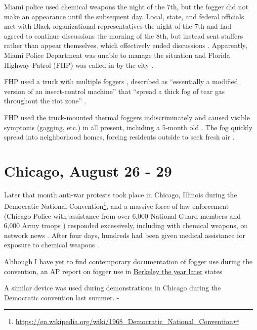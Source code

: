 \documentclass[
  11pt,
]{krantz}
\renewenvironment{quote}{\begin{VF}}{\end{VF}}
\renewcommand{\href}[2]{#2\footnote{\url{#1}}}
\begin{document}
Miami police used chemical weapons the night of the 7th, but the fogger did not make an appearance until the subsequent day.
Local, state, and federal officials met with Black organizational representatives the night of the 7th and had agreed to continue discussions the morning of the 8th, but instead sent staffers rather than appear themselves, which effectively ended discussions \citep{Tschenschlok1995, Tschenschlok1996}.
Apparently, Miami Police Department was unable to manage the situation and Florida Highway Patrol (FHP) was called in by the city \citep{Tschenschlok1995}.

FHP used a truck with multiple foggers \citep{Lorentzen2018}, described as ``essentially a modified version of an insect-control machine'' that ``spread a thick fog of tear gas throughout the riot zone'' \citep{Tschenschlok1995}.

FHP used the truck-mounted thermal foggers indiscriminately and caused visible symptoms (gagging, etc.) in all present, including a 5-month old \citep{McArdle2018}.
The fog quickly spread into neighborhood homes, forcing residents outside to seek fresh air \citep{Tschenschlok1995}.

\hypertarget{ChicagoIL1968_08_26}{%
\section*{Chicago, August 26 - 29}\label{ChicagoIL1968_08_26}}


Later that month anti-war protests took place in Chicago, Illinois during the \href{https://en.wikipedia.org/wiki/1968_Democratic_National_Convention}{Democratic National Convention}, and a massive force of law enforcement (Chicago Police with assistance from over 6,000 National Guard members and 6,000 Army troops \citep{TaylorandMorris2018}) responded excessively, including with chemical weapons, on network news \citep{Schultz1969, Karnow1983, Farber1988, Langguth2000}.
After four days, hundreds had been given medical assistance for exposure to chemical weapons \citep{TaylorandMorris2018}.

Although I have yet to find contemporary documentation of fogger use during the convention, an AP report on fogger use in \protect\hyperlink{BerkeleyCA1969_02_21}{Berkeley the year later} states

\begin{quote}
A similar device was used during demonstrations in Chicago during the Democratic convention last summer. - \citet{TheDailyTribune1969_02_21}
\end{quote}
\end{document}
